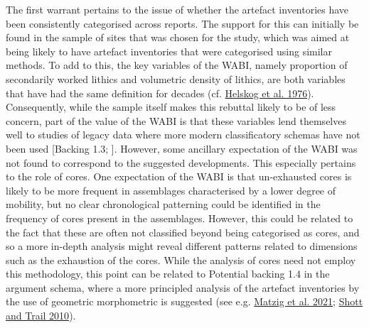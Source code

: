 \documentclass[
  12pt,
  a4paper,
  oneside]{book}
\begin{document}
The first warrant pertains to the issue of whether the artefact inventories have been consistently categorised across reports. The support for this can initially be found in the sample of sites that was chosen for the study, which was aimed at being likely to have artefact inventories that were categorised using similar methods. To add to this, the key variables of the WABI, namely proportion of secondarily worked lithics and volumetric density of lithics, are both variables that have had the same definition for decades (cf. \protect\hyperlink{ref-helskog1976}{Helskog et al. 1976}). Consequently, while the sample itself makes this rebuttal likely to be of less concern, part of the value of the WABI is that these variables lend themselves well to studies of legacy data where more modern classificatory schemas have not been used {[}Backing 1.3; {]}. However, some ancillary expectation of the WABI was not found to correspond to the suggested developments. This especially pertains to the role of cores. One expectation of the WABI is that un-exhausted cores is likely to be more frequent in assemblages characterised by a lower degree of mobility, but no clear chronological patterning could be identified in the frequency of cores present in the assemblages. However, this could be related to the fact that these are often not classified beyond being categorised as cores, and so a more in-depth analysis might reveal different patterns related to dimensions such as the exhaustion of the cores. While the analysis of cores need not employ this methodology, this point can be related to Potential backing 1.4 in the argument schema, where a more principled analysis of the artefact inventories by the use of geometric morphometric is suggested (see e.g. \protect\hyperlink{ref-matzig2021}{Matzig et al. 2021}; \protect\hyperlink{ref-shott2010}{Shott and Trail 2010}).
\end{document}
